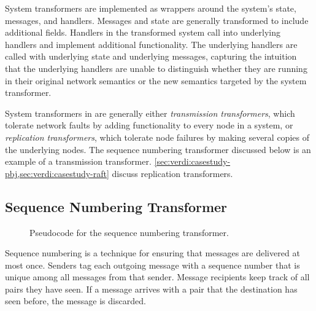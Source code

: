 \begin{sloppypar}
System transformers are implemented as wrappers around the system's state,
messages, and handlers. Messages and state are generally transformed to
include additional fields.  Handlers in the transformed system call into
underlying handlers and implement additional functionality.  The underlying
handlers are called with underlying state and underlying messages,
capturing the intuition that the underlying handlers are unable to
distinguish whether they are running in their original network semantics or
the new semantics targeted by the system transformer.
\end{sloppypar}

System transformers in \Verdi are generally either
\textit{transmission transformers}, which tolerate network faults by
adding functionality to every node in a system, or \textit{replication
  transformers}, which tolerate node failures by making several copies
of the underlying nodes. The sequence numbering transformer discussed
below is an example of a transmission
transformer. \cref{sec:verdi:casestudy-pbj,sec:verdi:casestudy-raft} discuss
replication transformers.

\subsection{Sequence Numbering Transformer}

\begin{figure}
\begin{footnotesize}
  
\end{footnotesize}
\caption{Pseudocode for the sequence numbering transformer.}
\label{fig:seqnum}
\end{figure}

Sequence numbering is a technique for ensuring that messages are
delivered at most once. Senders tag each outgoing message with a
sequence number that is unique among all messages from that
sender. Message recipients keep track of all
 pairs they have seen.  If a message arrives with a
 pair that the destination has
seen before, the message is discarded.

